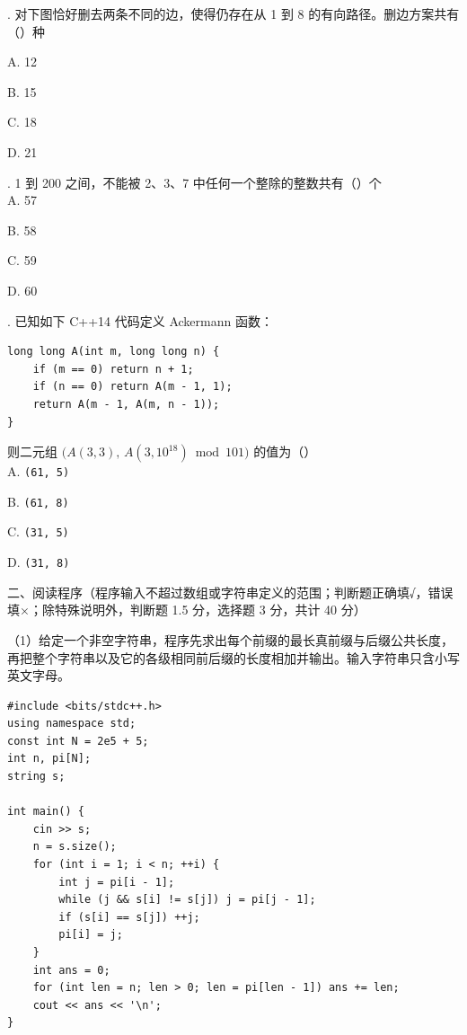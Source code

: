 \documentclass[a4paper]{ctexart}
\newcommand{\bigtitle}[1]{\noindent\heiti #1\par\vspace{2pt}}
\newcommand{\q}[1]{\noindent #1}
\newcommand{\opt}[1]{\hspace*{2em} #1\par}
\begin{document}
\q{13.} 对下图恰好删去两条不同的边，使得仍存在从 1 到 8 的有向路径。删边方案共有（\qquad）种
\begin{center}
\end{center}
\opt{A. 12}\opt{B. 15}\opt{C. 18}\opt{D. 21}

\q{14.} 1 到 200 之间，不能被 2、3、7 中任何一个整除的整数共有（\qquad）个\\
\opt{A. 57}\opt{B. 58}\opt{C. 59}\opt{D. 60}
\q{15.} 已知如下 C++14 代码定义 Ackermann 函数：
\begin{codebox}\begin{lstlisting}
long long A(int m, long long n) {
    if (m == 0) return n + 1;
    if (n == 0) return A(m - 1, 1);
    return A(m - 1, A(m, n - 1));
}
\end{lstlisting}\end{codebox}
则二元组 \(\bigl(A(3,3),\,A(3,10^{18})\bmod 101\bigr)\) 的值为（\qquad）\\
\opt{A. \texttt{(61, 5)}}\opt{B. \texttt{(61, 8)}}
\opt{C. \texttt{(31, 5)}}\opt{D. \texttt{(31, 8)}}

\clearpage
\bigtitle{二、阅读程序（程序输入不超过数组或字符串定义的范围；判断题正确填√，错误填×；除特殊说明外，判断题 1.5 分，选择题 3 分，共计 40 分）}

\noindent（1）给定一个非空字符串，程序先求出每个前缀的最长真前缀与后缀公共长度，
再把整个字符串以及它的各级相同前后缀的长度相加并输出。输入字符串只含小写英文字母。
\begin{codebox}\begin{lstlisting}
#include <bits/stdc++.h>
using namespace std;
const int N = 2e5 + 5;
int n, pi[N];
string s;

int main() {
    cin >> s;
    n = s.size();
    for (int i = 1; i < n; ++i) {
        int j = pi[i - 1];
        while (j && s[i] != s[j]) j = pi[j - 1];
        if (s[i] == s[j]) ++j;
        pi[i] = j;
    }
    int ans = 0;
    for (int len = n; len > 0; len = pi[len - 1]) ans += len;
    cout << ans << '\n';
}
\end{lstlisting}\end{codebox}
\end{document}
